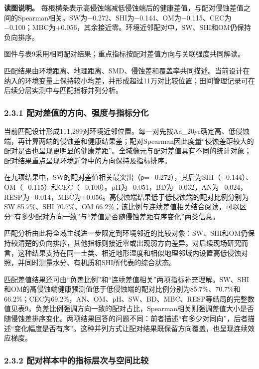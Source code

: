 \documentclass[
  11pt,
  a4paper,
]{ctexart}
\begin{document}
\textbf{读图说明。}
每根横条表示高侵蚀端减低侵蚀端后的健康差值，与配对侵蚀差值之间的Spearman相关。SW为−0.272、SHI为−0.144、OM为−0.115、CEC为−0.100；MBC为+0.056，其余接近零。环境近邻配对中，SW、SHI和OM仍保持负向排序。

图件与表9采用相同配对结果；重点指标按配对差值方向与关联强度共同解读。

匹配结果由环境距离、地理距离、SMD、侵蚀差和覆盖率共同描述。当前设计在纳入的环境变量上保持较小均差，并形成超过11万对比较位置；田间管理记录可在后续分层实测中与匹配指标并列分析。

\hypertarget{ux914dux5bf9ux5deeux503cux7684ux65b9ux5411ux5f3aux5ea6ux4e0eux6307ux6807ux5206ux5316}{%
\subsubsection{2.3.1
配对差值的方向、强度与指标分化}\label{ux914dux5bf9ux5deeux503cux7684ux65b9ux5411ux5f3aux5ea6ux4e0eux6307ux6807ux5206ux5316}}

当前匹配设计形成111,289对环境近邻位置。每一对先按Aa\_20yr确定高、低侵蚀端，再计算两端的侵蚀差和健康结果差；配对Spearman因此度量``侵蚀差距较大的配对是否也呈现更明显的健康差距''。全域像元与配对差值具有不同的统计对象；配对结果重点呈现环境近邻中的方向保持及指标排序。

在九项结果中，SW的配对差值相关最突出（ρ=−0.272），其后为SHI（−0.144）、OM（−0.115）和CEC（−0.100）。pH为−0.051，BD为−0.032，AN为−0.024，RESP为−0.014，MBC为+0.056。高侵蚀端结果低于低侵蚀端的配对比例分别为SW
85.7\%、SHI 70.7\%、OM
66.2\%；该比例与连续差值相关结合阅读，可以区分``有多少配对方向一致''与``差值是否随侵蚀差距有序变化''两类信息。

匹配分析由此将全域主线进一步限定到环境邻近的比较对象：SW、SHI和OM仍保持较清楚的负向排序，其他指标则接近零或出现弱方向差异。对后续现场研究而言，这种结果支持在同一土类、相近地形湿度和相似地理邻域内设置高低侵蚀对照，并同时测量水分、有机质和SHI所代表的综合状态。

匹配差值结果还可由``负差比例''和``连续差值相关''两项指标补充理解。SW、SHI和OM的高侵蚀端健康预测值低于低侵蚀端的配对比例分别为85.7\%、70.7\%和66.2\%；CEC为69.2\%，AN、OM、pH、SW、BD、MBC、RESP等结局的完整数值见表9。负差比例强调方向一致的配对占比，Spearman相关则强调差值大小是否随侵蚀差排序变化。两项结果回答的问题不同：前者描述``有多少对同向''，后者描述``变化幅度是否有序''。这种并列方式让配对结果既保留方向覆盖，也呈现连续效应梯度。

\hypertarget{ux914dux5bf9ux6837ux672cux4e2dux7684ux6307ux6807ux5c42ux6b21ux4e0eux7a7aux95f4ux6bd4ux8f83}{%
\subsubsection{2.3.2
配对样本中的指标层次与空间比较}\label{ux914dux5bf9ux6837ux672cux4e2dux7684ux6307ux6807ux5c42ux6b21ux4e0eux7a7aux95f4ux6bd4ux8f83}}
\end{document}

